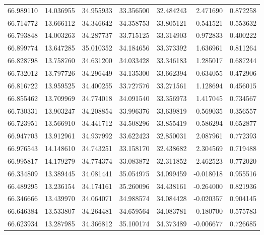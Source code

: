 \begin{tabular}{rrrrrrr}
 66.989110 &  14.036955 &         34.955933 &         33.356500 &         32.484243 &  2.471690 &  0.872258 \\
 66.714772 &  13.666112 &         34.346642 &         34.358753 &         33.805121 &  0.541521 &  0.553632 \\
 66.793848 &  14.003263 &         34.287737 &         33.715125 &         33.314903 &  0.972833 &  0.400222 \\
 66.899774 &  13.647285 &         35.010352 &         34.184656 &         33.373392 &  1.636961 &  0.811264 \\
 66.828798 &  13.758760 &         34.631200 &         34.033428 &         33.346183 &  1.285017 &  0.687244 \\
 66.732012 &  13.797726 &         34.296449 &         34.135300 &         33.662394 &  0.634055 &  0.472906 \\
 66.816722 &  13.959525 &         34.400255 &         33.727576 &         33.271561 &  1.128694 &  0.456015 \\
 66.855462 &  13.709969 &         34.774018 &         34.091540 &         33.356973 &  1.417045 &  0.734567 \\
 66.730331 &  13.903247 &         34.208854 &         33.996376 &         33.639819 &  0.569035 &  0.356557 \\
 66.723951 &  13.566910 &         34.441712 &         34.508296 &         33.855419 &  0.586294 &  0.652877 \\
 66.947703 &  13.912961 &         34.937992 &         33.622423 &         32.850031 &  2.087961 &  0.772393 \\
 66.976543 &  14.148610 &         34.743251 &         33.158170 &         32.438682 &  2.304569 &  0.719488 \\
 66.995817 &  14.179279 &         34.774374 &         33.083872 &         32.311852 &  2.462523 &  0.772020 \\
 66.334809 &  13.389445 &         34.081441 &         35.054975 &         34.099459 & -0.018018 &  0.955516 \\
 66.489295 &  13.236154 &         34.174161 &         35.260096 &         34.438161 & -0.264000 &  0.821936 \\
 66.346666 &  13.439970 &         34.064071 &         34.988574 &         34.084428 & -0.020357 &  0.904145 \\
 66.646384 &  13.533807 &         34.264481 &         34.659564 &         34.083781 &  0.180700 &  0.575783 \\
 66.623934 &  13.287985 &         34.366812 &         35.100174 &         34.373489 & -0.006677 &  0.726685 \\

\end{tabular}
